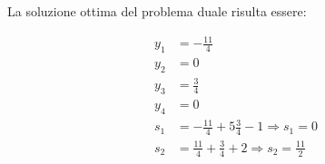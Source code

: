 \documentclass[\main/main.tex]{subfiles}
\begin{document}
La soluzione ottima del problema duale risulta essere:

\begin{align*}
  y_1 & = -\frac{11}{4}                                                \\
  y_2 & = 0                                                            \\
  y_3 & = \frac{3}{4}                                                  \\
  y_4 & = 0                                                            \\
  s_1 & = -\frac{11}{4} + 5\frac{3}{4} -1 \Rightarrow s_1 = 0          \\
  s_2 & = \frac{11}{4} + \frac{3}{4} +2 \Rightarrow s_2 = \frac{11}{2} \\
\end{align*}
\end{document}
